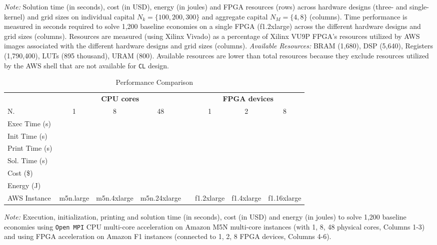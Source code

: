 \documentclass[12pt,american]{article}
\makeatletter
\newcommand{\resultsfolder}{./results}
\newcommand{\devfpgaI}{fpgaI}
\newcommand{\devfpgaII}{fpgaII}
\newcommand{\devfpgaIII}{fpgaIII}
\newcommand{\devcpu}{cpu-cores}
\newcommand{\nKMIkI}{nKM4-nk100}
\newcommand{\cpuI}{m5n.large\@\xspace}
\newcommand{\cpucoreI}{1}
\newcommand{\cpuII}{m5n.4xlarge\@\xspace}
\newcommand{\cpucoreII}{8}
\newcommand{\cpuIII}{m5n.24xlarge\@\xspace}
\newcommand{\cpucoreIII}{48}
\newcommand{\awsinstfI}{f1.2xlarge\@\xspace}
\newcommand{\awsinstfII}{f1.4xlarge\@\xspace}
\newcommand{\awsinstfIII}{f1.16xlarge\@\xspace}
\newcommand{\cpuItimetot}{}
\newcommand{\cpuIinittime}{}
\newcommand{\cpuIwritetime}{}
\newcommand{\cpuItime}{}
\newcommand{\cpuIcost}{}
\newcommand{\cpuIenergy}{}
\newcommand{\cpuIItimetot}{}
\newcommand{\cpuIIinittime}{}
\newcommand{\cpuIIwritetime}{}
\newcommand{\cpuIItime}{}
\newcommand{\cpuIIcost}{}
\newcommand{\cpuIIenergy}{}
\newcommand{\cpuIIItimetot}{}
\newcommand{\cpuIIIinittime}{}
\newcommand{\cpuIIIwritetime}{}
\newcommand{\cpuIIItime}{}
\newcommand{\cpuIIIcost}{}
\newcommand{\cpuIIIenergy}{}
\newcommand{\fpgaItimetot}{}
\newcommand{\fpgaIinittime}{}
\newcommand{\fpgaIwritetime}{}
\newcommand{\fpgaItime}{}
\newcommand{\fpgaIcost}{}
\newcommand{\fpgaIenergy}{}
\newcommand{\fpgaIItimetot}{}
\newcommand{\fpgaIIinittime}{}
\newcommand{\fpgaIIwritetime}{}
\newcommand{\fpgaIItime}{}
\newcommand{\fpgaIIcost}{}
\newcommand{\fpgaIIenergy}{}
\newcommand{\fpgaIIItimetot}{}
\newcommand{\fpgaIIIinittime}{}
\newcommand{\fpgaIIIwritetime}{}
\newcommand{\fpgaIIItime}{}
\newcommand{\fpgaIIIcost}{}
\newcommand{\fpgaIIIenergy}{}
\newcommand{\numbeconII}{1,200\@\xspace}
\newcommand{\CLdesignLUT}{895 thousand}
\newcommand{\CLdesignDSP}{5,640}
\newcommand{\CLdesignRegisters}{1,790,400}
\newcommand{\CLdesignBRAM}{1,680}
\newcommand{\CLdesignURAM}{800}
\makeatother
\begin{document}
\begin{table}[ht!]
\begin{center}
\end{center}
\label{tab:res}
\small \textit{Note:} Solution time (in seconds), cost (in USD), energy (in joules) and FPGA resources (rows) across hardware designs (three- and single-kernel) and grid sizes on individual capital $N_{k}=\{100,200,300\}$ and aggregate capital $N_{M}=\{4,8\}$ (columns). Time performance is measured in seconds required to solve \numbeconII baseline economies on a single FPGA (\awsinstfI) across the different hardware designs and grid sizes (columns). Resources are measured (using Xilinx Vivado) as a percentage of Xilinx VU9P FPGA's resources utilized by AWS images associated with the different hardware designs and grid sizes (columns). \textit{Available Resources:} BRAM (\CLdesignBRAM), DSP (\CLdesignDSP), Registers (\CLdesignRegisters), LUTs (\CLdesignLUT), URAM (\CLdesignURAM). Available resources are lower than total resources because they exclude resources utilized by the AWS shell that are not available for \texttt{CL} design.
\end{table}

\begin{table}[ht!]
\caption{Performance Comparison}\label{tab:perf_comp}
\vspace{-0.2in}
\hspace{-1.8cm} 
\begin{center}
\begin{tabular}{lccccccc}
\toprule
&\multicolumn{3}{c}{\textbf{CPU cores}}&&\multicolumn{3}{c}{\textbf{FPGA devices}}\\
\cmidrule{2-4}\cmidrule{6-8}
N.    &1&8&48&&1&2&8\\
\cmidrule{2-4}\cmidrule{6-8}
Exec Time (s) &\cpuItimetot &\cpuIItimetot &\cpuIIItimetot && \fpgaItimetot &\fpgaIItimetot &\fpgaIIItimetot\\
Init Time (s) &\cpuIinittime &\cpuIIinittime &\cpuIIIinittime&&  \fpgaIinittime&\fpgaIIinittime&\fpgaIIIinittime\\         
Print Time (s) &\cpuIwritetime &\cpuIIwritetime &\cpuIIIwritetime&& \fpgaIwritetime&\fpgaIIwritetime&\fpgaIIIwritetime\\     
Sol. Time (s) &\cpuItime &\cpuIItime &\cpuIIItime&& \fpgaItime&\fpgaIItime&\fpgaIIItime\\
Cost (\$) & \cpuIcost & \cpuIIcost &\cpuIIIcost && \fpgaIcost&\fpgaIIcost&\fpgaIIIcost\\
Energy (J) & \cpuIenergy& \cpuIIenergy &\cpuIIIenergy&& \fpgaIenergy&\fpgaIIenergy&\fpgaIIIenergy\\
\cmidrule{2-8}
AWS Instance & \cpuI & \cpuII  & \cpuIII &&\awsinstfI&\awsinstfII&\awsinstfIII \\  
\bottomrule         
\end{tabular}
\end{center}
\small
\textit{Note:} Execution, initialization, printing and solution time (in seconds), cost (in USD) and energy (in joules) to solve \numbeconII baseline economies using \texttt{Open MPI} CPU multi-core acceleration on Amazon M5N multi-core instances (with 1, 8, 48 physical cores, Columns 1-3) and using FPGA acceleration on Amazon F1 instances (connected to 1, 2, 8 FPGA devices, Columns 4-6). 
\end{table}
\end{document}
